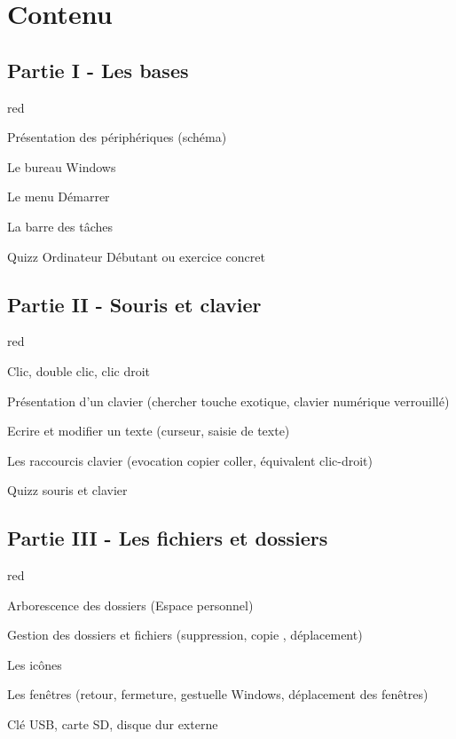 \chapter{Contenu}

\section{Partie I - Les bases}

\begin{items}{red}{\Circle}
\item Présentation des périphériques (schéma)
\item Le bureau Windows
\item Le menu Démarrer
\item La barre des tâches
\item Quizz Ordinateur Débutant ou exercice concret
\end{items}



\section{Partie II - Souris et clavier}

\begin{items}{red}{\Circle}
\item Clic, double clic, clic droit
\item Présentation d’un clavier (chercher touche exotique, clavier numérique verrouillé)
\item Ecrire et modifier un texte (curseur, saisie de texte)
\item Les raccourcis clavier (evocation copier coller, équivalent clic-droit)



\item Quizz souris et clavier
\end{items}


\section{Partie III - Les fichiers et dossiers}

\begin{items}{red}{\Circle}
 \item Arborescence des dossiers (Espace personnel) 
 \item Gestion des dossiers et fichiers (suppression, copie , déplacement)
\item Les icônes
\item Les fenêtres (retour, fermeture, gestuelle Windows, déplacement des fenêtres)
\item Clé USB, carte SD, disque dur externe
\end{items}



